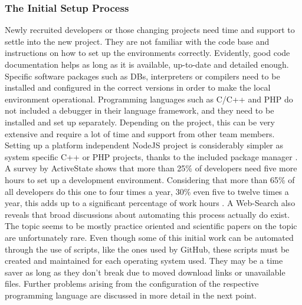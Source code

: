        \subsubsection{The Initial Setup Process}\label{sss::initial}
        Newly recruited developers or those changing projects need time and support to settle into the new project. They are not familiar with the code base and instructions on how to set up the environments correctly. Evidently, good code documentation helps as long as it is available, up-to-date and detailed enough. Specific software packages such as \ac{DB}s, interpreters or compilers need to be installed and configured in the correct versions in order to make the local environment operational. Programming languages such as C/C++ and PHP do not included a debugger in their language framework, and they need to be installed and set up separately. Depending on the project, this can be very extensive and require a lot of time and support from other team members. Setting up a platform independent NodeJS project is considerably simpler as system specific C++ or PHP projects, thanks to the included package manager . A survey by ActiveState shows that more than 25\% of developers need five more hours to set up a development environment. Considering that more than 65\% of all developers do this one to four times a year, 30\% even five to twelve times a year, this adds up to a significant percentage of work hours \cite{setuppain}. A Web-Search also reveals that broad discussions about automating this process actually do exist. The topic seems to be mostly practice oriented and scientific papers on the topic are unfortunately rare. Even though some of this initial work can be automated through the use of scripts, like the ones used by GitHub, these scripts must be created and maintained for each operating system used. They may be a time saver as long as they don't break due to moved download links or unavailable files.\newline
        Further problems arising from the configuration of the respective programming language are discussed in more detail in the next point.

